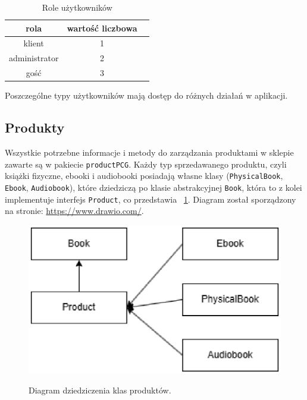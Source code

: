 \begin{table}[H]
    \caption{Role użytkowników}
    \label{tabRole}
    \centering
    \begin{tabular}{ccc}
        \toprule
        \textbf{rola} & \textbf{wartość liczbowa} \\ \toprule
        klient           & 1                              \\
        administrator           & 2                               \\
        gość           & 3                              \\
    \bottomrule
    \end{tabular}
\end{table}

Poszczególne typy użytkowników mają dostęp do różnych działań w aplikacji.


\subsection{Produkty}

Wszystkie potrzebne informacje i metody do zarządzania produktami w sklepie zawarte są w pakiecie \texttt{productPCG}.
Każdy typ sprzedawanego produktu, czyli książki fizyczne, ebooki i audiobooki posiadają własne klasy (\texttt{PhysicalBook}, \texttt{Ebook}, \texttt{Audiobook}), które dziedziczą
po klasie abstrakcyjnej \texttt{Book}, która to z kolei implementuje interfejs \texttt{Product}, co przedstawia \figurename~\ref{fig2}. Diagram został sporządzony na stronie: \url{https://www.drawio.com/}.

\begin{figure}[H]
    \centering
    \includegraphics[width=\linewidth]{figures/fig_0002.eps}\\
    \caption{Diagram dziedziczenia klas produktów.\label{fig2}}
\end{figure}


